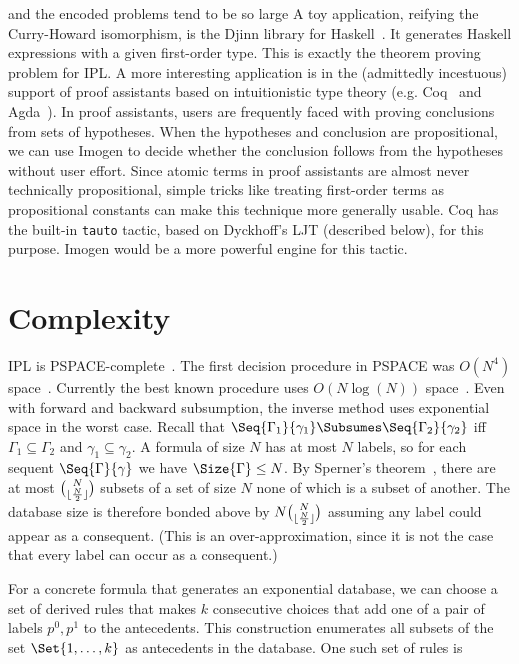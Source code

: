 and the encoded problems tend to be so large
A toy application, reifying the Curry-Howard isomorphism, is the
Djinn library for Haskell~\cite{Djinn}.  It generates Haskell expressions with a
given first-order type.  This is exactly the theorem proving problem for IPL.  A
more interesting application is in the (admittedly incestuous) support of proof
assistants based on intuitionistic type theory (e.g. Coq~\cite{Coq} and
Agda~\cite{Agda}).  In proof assistants, users are frequently faced with proving
conclusions from sets of hypotheses.  When the hypotheses and conclusion are
propositional, we can use Imogen to decide whether the conclusion follows from
the hypotheses without user effort.  Since atomic terms in proof assistants are
almost never technically propositional, simple tricks like treating first-order
terms as propositional constants can make this technique more generally usable.
Coq has the built-in \texttt{tauto} tactic, based on Dyckhoff's LJT (described
below), for this purpose.  Imogen would be a more powerful engine for this
tactic.

\section{Complexity}

IPL is PSPACE-complete~\cite{Statman.1979.TCS}.  The first decision procedure in
PSPACE was $O(N^4)$ space~\cite{Ladner.1977.SJC}.  Currently the best known
procedure uses $O(N\log(N))$ space~\cite{Hudelmaier.1993.JLC}.
Even with forward and backward subsumption, the inverse method uses exponential
space in the worst case.  Recall that
$\Seq{\Gamma_1}{\gamma_1}\Subsumes\Seq{\Gamma_2}{\gamma_2}$ iff
$\Gamma_1\subseteq\Gamma_2$ and $\gamma_1\subseteq\gamma_2$.  A formula of
size $N$ has at most $N$ labels, so for each sequent $\Seq{\Gamma}{\gamma}$ we
have $\Size{\Gamma} \leq N$.  By Sperner's theorem~\cite{Sperner.1928.MZ},
there are at most $\binom{N}{\lfloor\frac{N}{2}\rfloor}$ subsets of a set
of size $N$ none of which is a subset of another.  The database size is
therefore bonded above by $N \binom{N}{\lfloor\frac{N}{2}\rfloor}$ assuming any label
could appear as a consequent. (This is an over-approximation, since it is not
the case that every label can occur as a consequent.)

For a concrete formula that generates an exponential database, we can
choose a set of derived rules that makes $k$ consecutive choices that add
one of a pair of labels $p^0, p^1$ to the antecedents.  This construction enumerates
all subsets of the set $\Set{1, \ldots, k}$ as antecedents in the database.
One such set of rules is


